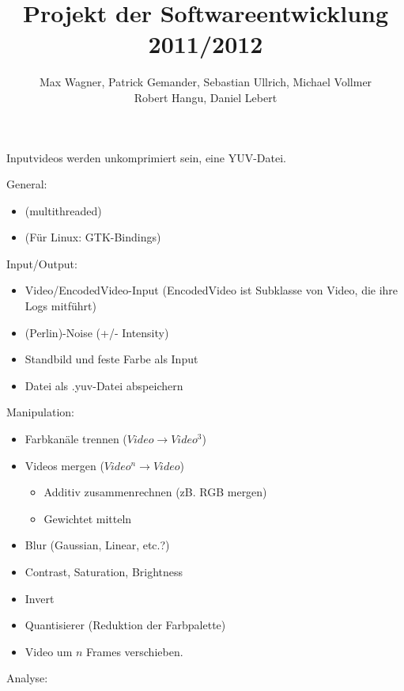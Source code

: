 \documentclass{article}
\begin{document}
\title{Projekt der Softwareentwicklung 2011/2012}
\author{Max Wagner, Patrick Gemander, Sebastian Ullrich, Michael Vollmer \\ Robert Hangu, Daniel Lebert}
\maketitle
Inputvideos werden unkomprimiert sein, eine YUV-Datei.


General:
    \begin{itemize}
        \item (multithreaded)
        \item (Für Linux: GTK-Bindings)
    \end{itemize}
Input/Output:
    \begin{itemize}

        \item Video/EncodedVideo-Input (EncodedVideo ist Subklasse von Video, die ihre Logs mitführt)
        \item (Perlin)-Noise (+/- Intensity)
        \item Standbild und feste Farbe als Input
        \item Datei als .yuv-Datei abspeichern
    \end{itemize}
Manipulation:
    \begin{itemize}
        \item Farbkanäle trennen ($Video \rightarrow Video^3$)
        \item Videos mergen ($Video^n \rightarrow Video$)
            \begin{itemize}
                \item Additiv zusammenrechnen (zB. RGB mergen)
                \item Gewichtet mitteln
            \end{itemize}
        \item Blur (Gaussian, Linear, etc.?)
        \item Contrast, Saturation, Brightness
        \item Invert
        \item Quantisierer (Reduktion der Farbpalette)
        \item Video um $n$ Frames verschieben.
    \end{itemize}
Analyse:
\end{document}
